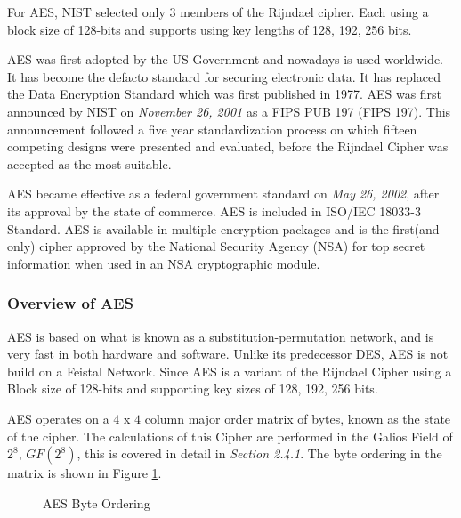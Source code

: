 For AES, NIST selected only 3 members of the Rijndael cipher. Each using a block size of 128-bits and supports using key lengths of 128, 192, 256 bits.

AES was first adopted by the US Government and nowadays is used worldwide. It has become the defacto standard for securing electronic data. It has replaced the Data Encryption Standard which was first published in 1977. AES was first announced by NIST on \textit{November 26, 2001} as a FIPS PUB 197 (FIPS 197). This announcement followed a five year standardization process on which fifteen competing designs were presented and evaluated, before the Rijndael Cipher was accepted as the most suitable.

AES became effective as a federal government standard on \textit{May 26, 2002}, after its approval by the state of commerce. AES is included in ISO/IEC 18033-3 Standard. AES is available in multiple encryption packages and is the first(and only) cipher approved by the National Security Agency (NSA) for top secret information when used in an NSA cryptographic module.

\subsubsection{Overview of AES}

AES is based on what is known as a substitution-permutation network, and is very fast in both hardware and software. Unlike its predecessor DES, AES is not build on a Feistal Network. Since AES is a variant of the Rijndael Cipher using a Block size of 128-bits and supporting key sizes of 128, 192, 256 bits.

AES operates on a $4$ x $4$ column major order matrix of bytes, known as the state of the cipher. The calculations of this Cipher are performed in the Galios Field of $2^8$, $GF(2^8)$, this is covered in detail in \textit{Section 2.4.1}. The byte ordering in the matrix is shown in Figure \ref{AES-Byte-Ordering}.

\begin{figure}[h!]
\begin{center}
\caption{AES Byte Ordering}
\label{AES-Byte-Ordering}
\end{center}
\end{figure}

